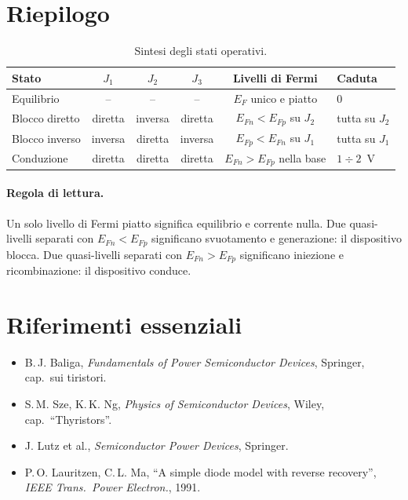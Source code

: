 \documentclass[11pt,a4paper]{article}
\begin{document}
\section{Riepilogo}

\begin{table}[h]
\centering
\small
\begin{tabular}{@{}lccccl@{}}
\toprule
Stato & $J_1$ & $J_2$ & $J_3$ & Livelli di Fermi & Caduta \\
\midrule
Equilibrio        & --      & --      & --      & $E_F$ unico e piatto & $0$ \\
Blocco diretto    & diretta & inversa & diretta & $E_{Fn}<E_{Fp}$ su $J_2$ & tutta su $J_2$ \\
Blocco inverso    & inversa & diretta & inversa & $E_{Fp}<E_{Fn}$ su $J_1$ & tutta su $J_1$ \\
Conduzione        & diretta & diretta & diretta & $E_{Fn}>E_{Fp}$ nella base & $1\div2$~V \\
\bottomrule
\end{tabular}
\caption{Sintesi degli stati operativi.}
\end{table}

\paragraph{Regola di lettura.} Un solo livello di Fermi piatto significa equilibrio
e corrente nulla. Due quasi-livelli separati con $E_{Fn}<E_{Fp}$ significano
svuotamento e generazione: il dispositivo blocca. Due quasi-livelli separati con
$E_{Fn}>E_{Fp}$ significano iniezione e ricombinazione: il dispositivo conduce.

\section*{Riferimenti essenziali}
\begin{itemize}\itemsep1pt
  \item B.\,J. Baliga, \emph{Fundamentals of Power Semiconductor Devices},
        Springer, cap.\ sui tiristori.
  \item S.\,M. Sze, K.\,K. Ng, \emph{Physics of Semiconductor Devices},
        Wiley, cap.\ ``Thyristors''.
  \item J. Lutz et al., \emph{Semiconductor Power Devices}, Springer.
  \item P.\,O. Lauritzen, C.\,L. Ma, ``A simple diode model with reverse recovery'',
        \emph{IEEE Trans.\ Power Electron.}, 1991.
\end{itemize}
\end{document}
